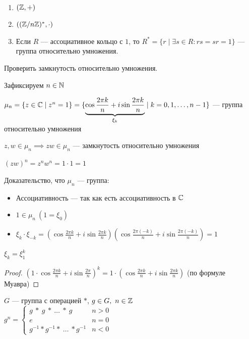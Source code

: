 \begin{examples}~

    \begin{enumerate}
        \item $(\mathbb{Z}, +)$
        \item $((\mathbb{Z}/n\mathbb{Z})^*, \cdot)$
        \item Если $R$ --- ассоциативное кольцо с $1$, то $R^* = \{r \mid \exists s \in R : rs = sr = 1\}$ --- группа относительно умножения.
    \end{enumerate}
\end{examples}

Проверить замкнутость относительно умножения. 

Зафиксируем $n \in \mathbb{N}$

$\mu_n = \{ z \in \mathbb{C} \mid z^n = 1\} = \{ \underbrace{\cos \frac{2 \pi k}{n} + i \sin \frac{2 \pi k}{n}}_{\xi_k} \mid k = 0, 1, \ldots, n-1 \}$ --- группа относительно умножения

$z, w \in \mu_n \implies zw \in \mu_n$ --- замкнутость относительно умножения

$(zw)^n = z^n w^n = 1 \cdot 1 = 1$

Доказательство, что $\mu_n$ --- группа:

\begin{itemize}
    \item Ассоциативность --- так как есть ассоциативность в $\mathbb{C}$
    
    \item $1 \in \mu_n~(1 = \xi_0)$
    
    \item $\xi_k \cdot \xi_{-k} = \left( \cos \frac{2 \pi k}{n} + i \sin \frac{2 \pi k}{n} \right) \left( \cos \frac{2 \pi (-k)}{n} + i \sin \frac{2 \pi (-k)}{n} \right) = 1$
\end{itemize}

\begin{lemma}
    $\xi_k = \xi_1^k$
\end{lemma}

\begin{proof}
    $\left(1 \cdot \cos \frac{2 \pi k}{n} + i \sin \frac{2 \pi}{n}\right)^k = 1 \cdot \left( \cos \frac{2 \pi k}{n} + i \sin \frac{2 \pi k}{n} \right)$ (по формуле Муавра)
\end{proof}

\begin{defn}
    $G$ --- группа с операцией $*$, $g \in G,~n \in \mathbb{Z}$\\

    $g^n = \begin{cases}
        g~*~g~*~\ldots~*~g & n > 0 \\
        e & n = 0 \\
        g^{-1} * g^{-1} *~\ldots~* g^{-1} & n < 0
    \end{cases}$
\end{defn}

